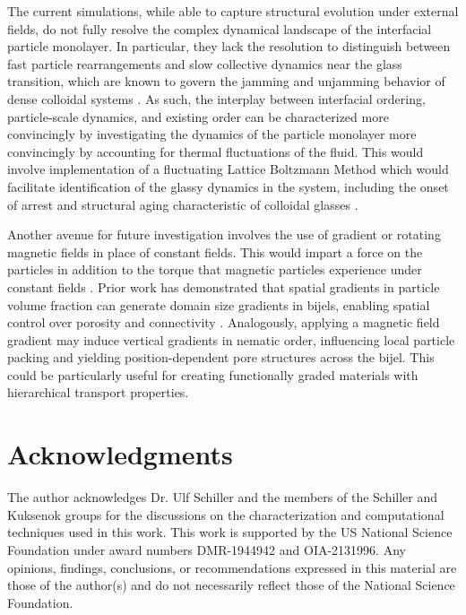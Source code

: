 The current simulations, while able to capture structural evolution under external fields, do not fully resolve the complex dynamical 
landscape of the interfacial particle monolayer. In particular, they lack the resolution to distinguish between fast particle rearrangements 
and slow collective dynamics near the glass transition, which are known to govern the jamming and unjamming behavior of dense 
colloidal systems \cite{weeks_introduction_2017, torquato_jammed_2010}. 
As such, the interplay between interfacial ordering, particle-scale dynamics, and existing order can be characterized more convincingly by 
investigating the dynamics of the particle monolayer more convincingly by accounting for thermal fluctuations of the fluid. This would involve 
implementation of a fluctuating Lattice Boltzmann Method which would facilitate identification of the glassy dynamics in the system, 
including the onset of arrest and structural aging characteristic of colloidal glasses \cite{weeks_introduction_2017, torquato_jammed_2010}.

Another avenue for future investigation involves the use of gradient or rotating magnetic fields in place of constant fields. This
would impart a force on the particles in addition to the torque that magnetic particles experience under 
constant fields \cite{spatafora-salazar_hierarchical_2021, martinezpedrero_collective_2020}.
Prior work has demonstrated that spatial gradients in particle volume fraction can generate domain size gradients in bijels, enabling spatial 
control over porosity and connectivity \cite{french_bicontinuous_2022}. Analogously, applying a magnetic field gradient may induce vertical 
gradients in nematic order, influencing local particle packing and yielding position-dependent pore structures across the bijel. This could be 
particularly useful for creating functionally graded materials with hierarchical transport properties.

\section{Acknowledgments}

The author acknowledges Dr. Ulf Schiller and the members of the Schiller and Kuksenok groups for the discussions on 
the characterization and computational techniques used in this work. This work is supported by the US National Science 
Foundation under award numbers DMR-1944942 and OIA-2131996. Any opinions, findings, conclusions, or recommendations 
expressed in this material are those of the author(s) and do not necessarily reflect those of the National Science 
Foundation.  

